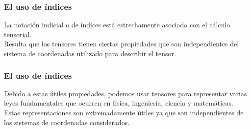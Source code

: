 \documentclass[12pt]{beamer}
\begin{document}
\begin{frame}
\frametitle{El uso de índices}
La notación indicial o de índices está estrechamente asociada con el cálculo tensorial.
\\
\bigskip
\pause
Resulta que los tensores tienen ciertas propiedades que son independientes del sistema de coordenadas utilizado para describir el tensor.
\end{frame}
\begin{frame}
\frametitle{El uso de índices}
Debido a estas útiles propiedades, podemos usar tensores para representar varias leyes fundamentales que ocurren en física, ingeniería, ciencia y matemáticas.
\\
\bigskip
\pause
Estas representaciones son extremadamente útiles ya que son independientes de los sistemas de coordenadas considerados.
\end{frame}
\end{document}
